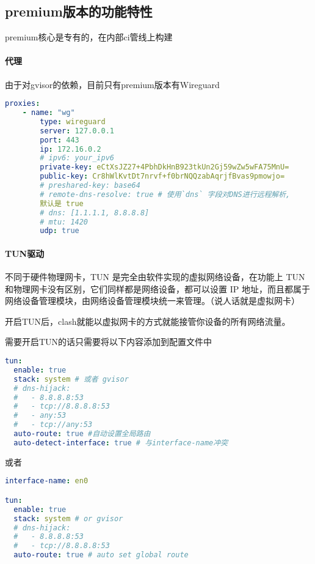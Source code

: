 \subsection{premium版本的功能特性}
premium核心是专有的，在内部ci管线上构建

\paragraph{代理}
由于对gvisor的依赖，目前只有premium版本有Wireguard\\

\begin{lstlisting}[breaklines=true,language=yaml,style=yaml]
  proxies:
    - name: "wg"
        type: wireguard
        server: 127.0.0.1
        port: 443
        ip: 172.16.0.2
        # ipv6: your_ipv6
        private-key: eCtXsJZ27+4PbhDkHnB923tkUn2Gj59wZw5wFA75MnU=
        public-key: Cr8hWlKvtDt7nrvf+f0brNQQzabAqrjfBvas9pmowjo=
        # preshared-key: base64
        # remote-dns-resolve: true # 使用`dns` 字段对DNS进行远程解析, 
        默认是 true
        # dns: [1.1.1.1, 8.8.8.8]
        # mtu: 1420
        udp: true
\end{lstlisting}


\paragraph{TUN驱动}


不同于硬件物理网卡，TUN 是完全由软件实现的虚拟网络设备，在功能上 TUN 和物理网卡没有区别，它们同样都是网络设备，都可以设置 IP 地址，而且都属于网络设备管理模块，由网络设备管理模块统一来管理。（说人话就是虚拟网卡）

开启TUN后，clash就能以虚拟网卡的方式就能接管你设备的所有网络流量。

需要开启TUN的话只需要将以下内容添加到配置文件中\\ 


\begin{lstlisting}[breaklines=true,language=yaml,style=yaml]
tun:
  enable: true
  stack: system # 或者 gvisor
  # dns-hijack:
  #   - 8.8.8.8:53
  #   - tcp://8.8.8.8:53
  #   - any:53
  #   - tcp://any:53
  auto-route: true #自动设置全局路由
  auto-detect-interface: true # 与interface-name冲突
\end{lstlisting}

或者
\begin{lstlisting}[breaklines=true,language=yaml,style=yaml]
interface-name: en0

tun:
  enable: true
  stack: system # or gvisor
  # dns-hijack:
  #   - 8.8.8.8:53
  #   - tcp://8.8.8.8:53
  auto-route: true # auto set global route
\end{lstlisting}



